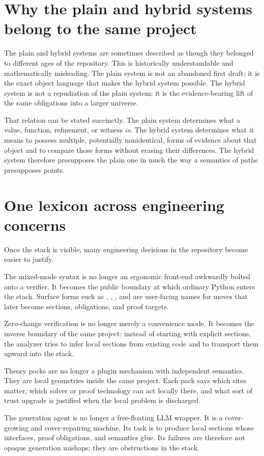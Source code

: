 \section*{Why the plain and hybrid systems belong to the same project}
The plain and hybrid systems are sometimes described as though they belonged to different
ages of the repository. This is historically understandable and mathematically misleading.
The plain system is not an abandoned first draft; it is the exact object language that makes
the hybrid system possible. The hybrid system is not a repudiation of the plain system; it
is the evidence-bearing lift of the same obligations into a larger universe.

That relation can be stated succinctly. The plain system determines what a value, function,
refinement, or witness \emph{is}. The hybrid system determines what it means to possess
multiple, potentially nonidentical, forms of evidence about that object and to compare those
forms without erasing their differences. The hybrid system therefore presupposes the plain
one in much the way a semantics of paths presupposes points.

\section*{One lexicon across engineering concerns}
Once the stack is visible, many engineering decisions in the repository become easier to
justify.

The mixed-mode syntax is no longer an ergonomic front-end awkwardly bolted onto a verifier.
It becomes the public boundary at which ordinary Python enters the stack. Surface forms such
as , , , and  are user-facing names for
moves that later become sections, obligations, and proof targets.

Zero-change verification is no longer merely a convenience mode. It becomes the inverse
boundary of the same project: instead of starting with explicit sections, the analyzer tries
to infer local sections from existing code and to transport them upward into the stack.

Theory packs are no longer a plugin mechanism with independent semantics. They are local
geometries inside the same project. Each pack says which sites matter, which solver or proof
technology can act locally there, and what sort of trust upgrade is justified when the local
problem is discharged.

The generation agent is no longer a free-floating LLM wrapper. It is a cover-growing and
cover-repairing machine. Its task is to produce local sections whose interfaces, proof
obligations, and semantics glue. Its failures are therefore not opaque generation mishaps;
they are obstructions in the stack.


